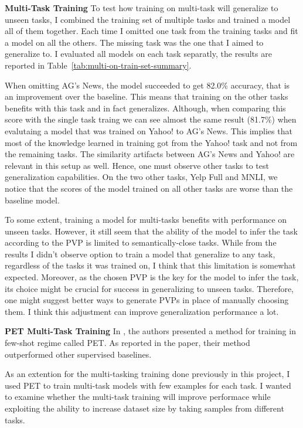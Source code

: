 \documentclass[11pt,a4paper]{article}
\begin{document}
\vspace{8pt}
\noindent\textbf{Multi-Task Training}\quad
To test how training on multi-task will generalize to unseen tasks, I combined the training set of multiple tasks and trained a model all of them together.
Each time I omitted one task from the training tasks and fit a model on all the others.
The missing task was the one that I aimed to generalize to.
I evaluated all models on each task separatly, the results are reported in Table~\ref{tab:multi-on-train-set-summary}.

When omitting AG's News, the model succeeded to get 82.0\% accuracy, that is an improvement over the baseline.
This means that training on the other tasks benefits with this task and in fact generalizes.
Although, when comparing this score with the single task traing we can see almost the same result (81.7\%) when evalutaing a model that was trained on Yahoo! to AG's News.
This implies that most of the knowledge learned in training got from the Yahoo! task and not from the remaining tasks.
The similarity artifacts between AG's News and Yahoo! are relevant in this setup as well.
Hence, one must observe other tasks to test generalization capabilities.
On the two other tasks, Yelp Full and MNLI, we notice that the scores of the model trained on all other tasks are worse than the baseline model.

To some extent, training a model for multi-tasks benefits with performance on unseen tasks.
However, it still seem that the ability of the model to infer the task according to the PVP is limited to semantically-close tasks.
While from the results I didn't observe option to train a model that generalize to any task, regardless of the tasks it was trained on, I think that this limitation is somewhat expected.
Moreover, as the chosen PVP is the key for the model to infer the task, its choice might be crucial for success in generalizing to unseen tasks.
Therefore, one might suggest better ways to generate PVPs in place of manually choosing them.
I think this adjustment can improve generalization performance a lot.


\vspace{8pt}

\noindent\textbf{PET Multi-Task Training}\quad
In \citet{schick2020exploiting}, the authors presented a method for training in few-shot regime called PET.
As reported in the paper, their method outperformed other supervised baselines.

As an extention for the multi-tasking training done previously in this project, I used PET to train multi-task models with few examples for each task.
I wanted to examine whether the multi-task training will improve performace while exploiting the ability to increase dataset size by taking samples from different tasks.
\end{document}

